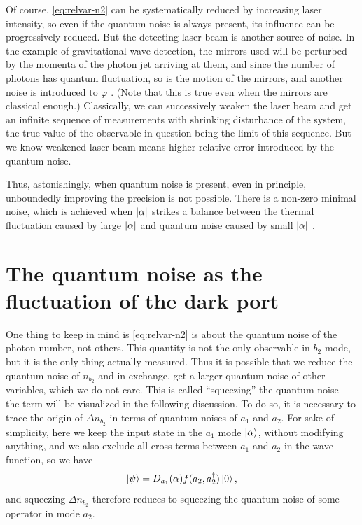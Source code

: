 \documentclass[hyperref, a4paper]{article}
\begin{document}
Of course, \eqref{eq:relvar-n2} can be systematically reduced by increasing laser intensity,
so even if the quantum noise is always present, 
its influence can be progressively reduced.
But the detecting laser beam is another source of noise.
In the example of gravitational wave detection,
the mirrors used will be perturbed by the momenta of the photon jet arriving at them,
and since the number of photons has quantum fluctuation,
so is the motion of the mirrors,
and another noise is introduced to $\varphi$ \cite{caves1980quantum,abadie_gravitational_2011}.
(Note that this is true even when the mirrors are classical enough.) 
Classically,
we can successively weaken the laser beam 
and get an infinite sequence of measurements
with shrinking disturbance of the system,
the true value of the observable in question being the limit of this sequence.
But we know weakened laser beam means higher relative error 
introduced by the quantum noise.

Thus, astonishingly,
when quantum noise is present, 
even in principle, 
unboundedly improving the precision is not possible.
There is a non-zero minimal noise,
which is achieved when $\abs{\alpha}$ strikes a balance 
between the thermal fluctuation caused by large $\abs{\alpha}$
and quantum noise caused by small $\abs{\alpha}$ \cite{caves_quantum-mechanical_1981}.


\section{The quantum noise as the fluctuation of the dark port}\label{sec:dark-port-analysis}

One thing to keep in mind is \eqref{eq:relvar-n2} 
is about the quantum noise of the photon number, not others.
This quantity is not the only observable in $b_2$ mode,
but it is the only thing actually measured.
Thus it is possible that we reduce the quantum noise of $n_{b_2}$
and in exchange, get a larger quantum noise of other variables,
which we do not care.
This is called ``squeezing'' the quantum noise
-- the term will be visualized in the following discussion.
To do so, it is necessary to trace the origin of $\Delta{n_{b_2}}$ 
in terms of quantum noises of $a_1$ and $a_2$. 
For sake of simplicity,
here we keep the input state in the $a_1$ mode $\ket{\alpha}$,
without modifying anything,
and we also exclude all cross terms between $a_1$ and $a_2$ in the wave function, 
so we have 
\begin{equation}
    \ket{\psi} = D_{a_1}(\alpha) f(a_2, a_2^\dagger) \ket{0},
    \label{eq:coherent-plus-squeeze}
\end{equation}
and squeezing $\Delta{n_{b_2}}$ therefore reduces to squeezing the quantum noise of some operator in mode $a_2$.
\end{document}
